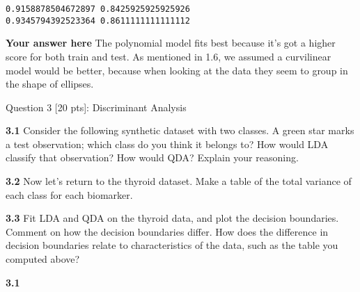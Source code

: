 \documentclass[11pt]{article}
\begin{document}
    \begin{Verbatim}[commandchars=\\\{\}]
0.9158878504672897 0.8425925925925926
0.9345794392523364 0.8611111111111112

    \end{Verbatim}

    \textbf{Your answer here} The polynomial model fits best because it's
got a higher score for both train and test. As mentioned in 1.6, we
assumed a curvilinear model would be better, because when looking at the
data they seem to group in the shape of ellipses.

     Question 3 {[}20 pts{]}: Discriminant Analysis

    \textbf{3.1} Consider the following synthetic dataset with two classes.
A green star marks a test observation; which class do you think it
belongs to? How would LDA classify that observation? How would QDA?
Explain your reasoning.

\textbf{3.2} Now let's return to the thyroid dataset. Make a table of
the total variance of each class for each biomarker.

\textbf{3.3} Fit LDA and QDA on the thyroid data, and plot the decision
boundaries. Comment on how the decision boundaries differ. How does the
difference in decision boundaries relate to characteristics of the data,
such as the table you computed above?

    \textbf{3.1}
\end{document}
